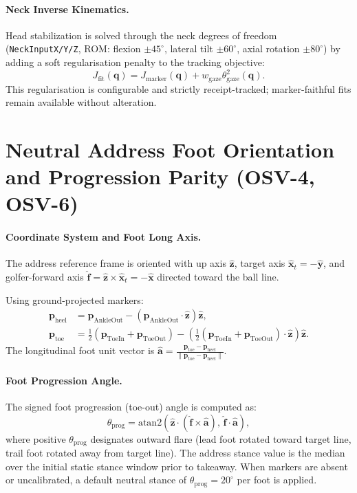\documentclass[11pt]{article}
\begin{document}
\paragraph{Neck Inverse Kinematics.}
Head stabilization is solved through the neck degrees of freedom (\texttt{NeckInputX/Y/Z}, ROM: flexion $\pm 45^\circ$, lateral tilt $\pm 60^\circ$, axial rotation $\pm 80^\circ$) by adding a soft regularisation penalty to the tracking objective:
\begin{equation}
  J_{\mathrm{fit}}(\mathbf{q}) = J_{\mathrm{marker}}(\mathbf{q}) + w_{\mathrm{gaze}} \theta_{\mathrm{gaze}}^2(\mathbf{q}) .
\end{equation}
This regularisation is configurable and strictly receipt-tracked; marker-faithful fits remain available without alteration.

\section{Neutral Address Foot Orientation and Progression Parity (OSV-4, OSV-6)}
\label{sec:foot_progression_osv}

\paragraph{Coordinate System and Foot Long Axis.}
The address reference frame is oriented with up axis $\hat{\mathbf{z}}$, target axis $\hat{\mathbf{x}}_t = -\hat{\mathbf{y}}$, and golfer-forward axis $\hat{\mathbf{f}} = \hat{\mathbf{z}} \times \hat{\mathbf{x}}_t = -\hat{\mathbf{x}}$ directed toward the ball line.

Using ground-projected markers:
\begin{align}
  \mathbf{p}_{\mathrm{heel}} &= \mathbf{p}_{\mathrm{AnkleOut}} - (\mathbf{p}_{\mathrm{AnkleOut}} \cdot \hat{\mathbf{z}}) \hat{\mathbf{z}} , \\
  \mathbf{p}_{\mathrm{toe}} &= \frac{1}{2}(\mathbf{p}_{\mathrm{ToeIn}} + \mathbf{p}_{\mathrm{ToeOut}}) - \left( \frac{1}{2}(\mathbf{p}_{\mathrm{ToeIn}} + \mathbf{p}_{\mathrm{ToeOut}}) \cdot \hat{\mathbf{z}} \right) \hat{\mathbf{z}} .
\end{align}
The longitudinal foot unit vector is $\hat{\mathbf{a}} = \frac{\mathbf{p}_{\mathrm{toe}} - \mathbf{p}_{\mathrm{heel}}}{\|\mathbf{p}_{\mathrm{toe}} - \mathbf{p}_{\mathrm{heel}}\|}$.

\paragraph{Foot Progression Angle.}
The signed foot progression (toe-out) angle is computed as:
\begin{equation}
  \theta_{\mathrm{prog}} = \mathrm{atan2}\left( \hat{\mathbf{z}} \cdot (\hat{\mathbf{f}} \times \hat{\mathbf{a}}),\, \hat{\mathbf{f}} \cdot \hat{\mathbf{a}} \right) ,
\end{equation}
where positive $\theta_{\mathrm{prog}}$ designates outward flare (lead foot rotated toward target line, trail foot rotated away from target line). The address stance value is the median over the initial static stance window prior to takeaway. When markers are absent or uncalibrated, a default neutral stance of $\theta_{\mathrm{prog}} = 20^\circ$ per foot is applied.
\end{document}

